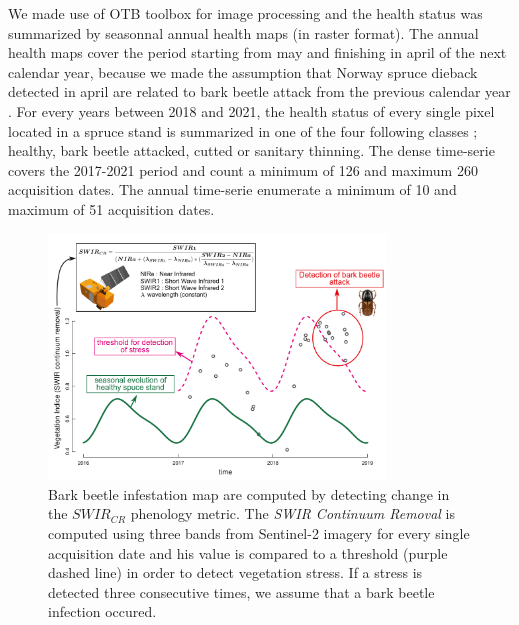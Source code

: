 \documentclass[3p,procedia]{elsarticle}
\begin{document}
We made use of OTB toolbox \citep{grizonnet_2017_OTB} for image processing and the health status was summarized by seasonnal annual health maps (in raster format).
The annual health maps cover the period starting from may and finishing in april of the next calendar year, because we made the assumption that Norway spruce dieback detected in april are related to bark beetle attack from the previous calendar year \citep{muller_features_2022}.
For every years between 2018 and 2021, the health status of every single pixel located in a spruce stand is summarized in one of the four following classes ; healthy, bark beetle attacked, cutted or sanitary thinning.
The dense time-serie covers the 2017-2021 period and count a minimum of 126 and maximum 260 acquisition dates. 
The annual time-serie enumerate a minimum of 10 and maximum of 51 acquisition dates. 
 


\begin{figure}[htbp] 
	\centering
	\includegraphics[width=0.8\textwidth]{fctHarmo.png}
	\caption{Bark beetle infestation map are computed by detecting change in the $SWIR_{CR}$ phenology metric. The \textit{SWIR Continuum Removal} is computed using three bands from Sentinel-2 imagery for every single acquisition date and his value is compared to a threshold (purple dashed line) in order to detect vegetation stress. If a stress is detected three consecutive times, we assume that a bark beetle infection occured.}
	\label{fig:harmo}
\end{figure}
\end{document}
